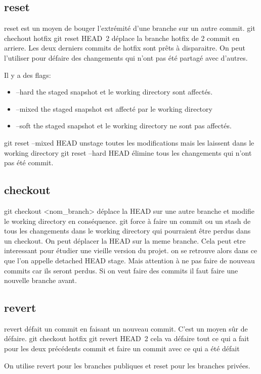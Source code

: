 \documentclass[12pt,a4paper]{article}
\begin{document}
\subsection{reset}
reset est un moyen de bouger l'extrémité d'une branche sur un autre commit.
git chechout hotfix
git reset HEAD~2 
déplace la branche hotfix de 2 commit en arriere.
Les deux derniers commits de hotfix sont prêts à disparaitre. 
On peut l'utiliser pour défaire des changements qui n'ont pas été partagé avec d'autres.

Il y a des flags:
\begin{itemize}
\item  --hard the staged snapshot et le working directory sont affectés.
\item --mixed the staged snapshot est affecté par le working directory
\item --soft the staged snapshot et le working directory ne sont  pas affectés.
\end{itemize}

git reset --mixed HEAD unstage toutes les modifications mais les laissent dans le working directory
git reset --hard HEAD élimine tous les changements qui n'ont pas été commit.

\subsection{checkout}
git checkout <nom\_branch> déplace la HEAD sur une autre branche et modifie le working directory en conséquence. git force à faire un commit ou un stash de tous les changements dans le working directory qui pourraient être perdus dans un checkout.
On peut déplacer la HEAD sur la meme branche. Cela peut etre interessant pour étudier une vieille version du projet. on se retrouve alors dans ce que l'on appelle detached HEAD stage. Mais attention à ne pas faire de nouveau commits car ils seront perdus. Si on veut faire des commits il faut faire une nouvelle branche avant.

\subsection{revert}
revert défait un commit en faisant un nouveau commit. C'est un moyen sûr de défaire. 
git checkout hotfix
git revert  HEAD~2
cela va défaire tout ce qui a fait pour les deux précédents commit et faire un commit avec ce  qui a été défait

On utilise revert pour les branches publiques et reset pour les branches privées.
\end{document}

